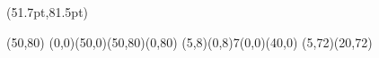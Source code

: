 

\PapierGroesse(51.7pt,81.5pt)



\begin{psfigur}[clip=nein,rahmen=nein](50,80)
\psPolygon[fuellfarbe=1:1:0.96](0,0)(50,0)(50,80)(0,80)%
\psMultipin(5,8)(0,8){7}{\psLinie(0,0)(40,0)}%
\psLinie(5,72)(20,72)
\end{psfigur}

